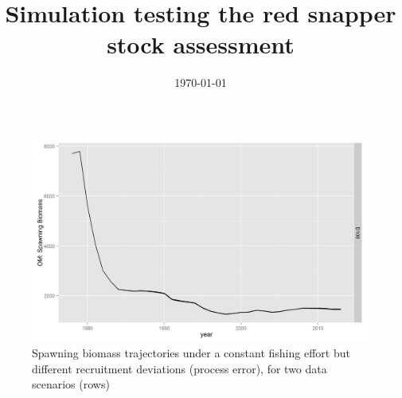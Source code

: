 \documentclass{article}
\begin{document}
\title{Simulation testing the red snapper stock assessment }
\date{\today{}}
\maketitle


\begin{figure}[h]
  \centering
    \includegraphics[width=6in]{../plots/det_SSB_om.png}
  \caption{Spawning biomass trajectories under a constant fishing effort but different recruitment deviations (process error), for two data scenarios (rows)}
  \label{fig:det_SSB_om}
\end{figure}
\end{document}
